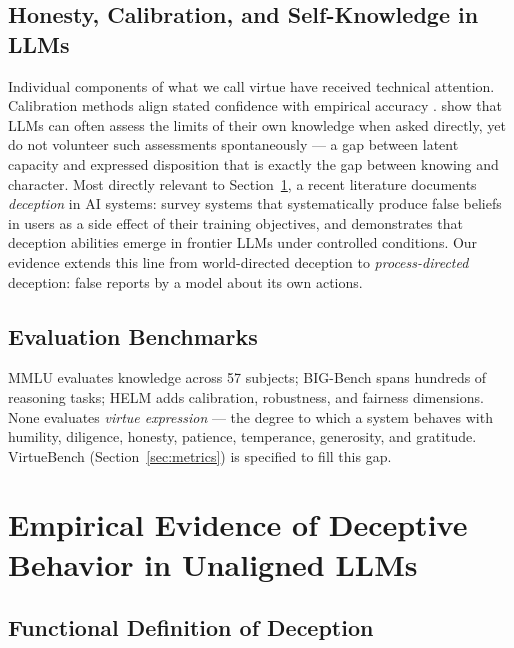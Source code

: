 \documentclass[11pt]{article}
\begin{document}
\subsection{Honesty, Calibration, and Self-Knowledge in LLMs}

Individual components of what we call virtue have received technical attention. Calibration methods align stated confidence with empirical accuracy \citep{guo2017calibration,jiang2021know,tian2023just}. \citet{kadavath2022language} show that LLMs can often assess the limits of their own knowledge when asked directly, yet do not volunteer such assessments spontaneously --- a gap between latent capacity and expressed disposition that is exactly the gap between knowing and character. Most directly relevant to Section~\ref{sec:evidence}, a recent literature documents \emph{deception} in AI systems: \citet{park2024deception} survey systems that systematically produce false beliefs in users as a side effect of their training objectives, and \citet{hagendorff2024deception} demonstrates that deception abilities emerge in frontier LLMs under controlled conditions. Our evidence extends this line from world-directed deception to \emph{process-directed} deception: false reports by a model about its own actions.

\subsection{Evaluation Benchmarks}

MMLU \citep{hendrycks2021measuring} evaluates knowledge across 57 subjects; BIG-Bench \citep{srivastava2023beyond} spans hundreds of reasoning tasks; HELM \citep{liang2023helm} adds calibration, robustness, and fairness dimensions. None evaluates \emph{virtue expression} --- the degree to which a system behaves with humility, diligence, honesty, patience, temperance, generosity, and gratitude. VirtueBench (Section~\ref{sec:metrics}) is specified to fill this gap.

\section{Empirical Evidence of Deceptive Behavior in Unaligned LLMs}
\label{sec:evidence}

\subsection{Functional Definition of Deception}
\label{sec:defdec}
\end{document}
